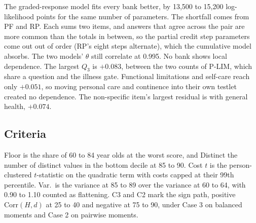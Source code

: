 \documentclass[11pt]{article}
\begin{document}


The graded-response model fits every bank better, by 13{,}500 to 15{,}200
log-likelihood points for the same number of parameters. The shortfall comes
from PF and RP. Each sums two items, and answers that agree across the pair
are more common than the totals in between, so the partial credit step
parameters come out out of order (RP's eight steps alternate), which the
cumulative model absorbs. The two models' $\theta$ still correlate at 0.995.
No bank shows local dependence. The largest $Q_3$ is $+0.083$, between the
two counts of P-LIM, which share a question and the illness gate. Functional
limitations and self-care reach only $+0.051$, so moving personal care and
continence into their own testlet created no dependence. The non-specific
item's largest residual is with general health, $+0.074$.

\subsection{Criteria}
Floor is the share of 60 to 84 year olds at the worst score, and Distinct
the number of distinct values in the bottom decile at 85 to 90. Cost $t$ is
the person-clustered $t$-statistic on the quadratic term with costs capped at
their 99th percentile. Var.\ is the variance at 85 to 89 over the variance at
60 to 64, with 0.90 to 1.10 counted as flattening. C3 and C2 mark the sign path, positive $\mathrm{Corr}(H,d)$ at
25 to 40 and negative at 75 to 90, under Case 3 on balanced moments and
Case 2 on pairwise moments.


\end{document}
